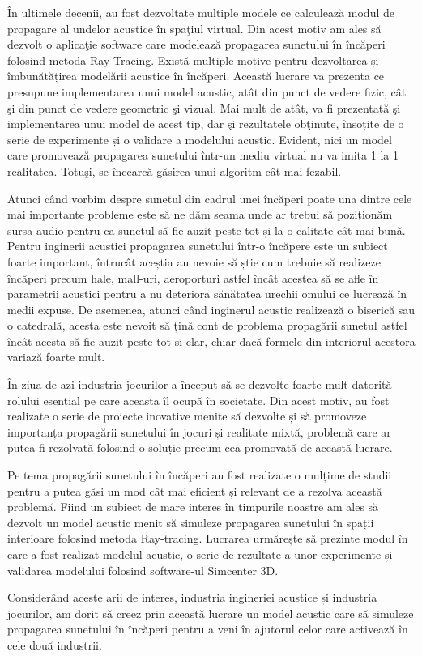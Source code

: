 	\^{I}n ultimele decenii, au fost dezvoltate multiple modele ce calculeaz\u{a} modul de propagare al undelor acustice \^{i}n spa\c{t}iul virtual. Din acest motiv am ales s\u{a} dezvolt o aplica\c{t}ie software care modeleaz\u{a} propagarea sunetului în încăperi folosind metoda Ray-Tracing. Exist\u{a} multiple motive pentru dezvoltarea și îmbunătățirea model\u{a}rii acustice \^{i}n \^{i}nc\u{a}peri. Aceast\u{a} lucrare va prezenta ce presupune implementarea unui model acustic, at\^{a}t din punct de vedere fizic, c\^{a}t \c{s}i din punct de vedere geometric \c{s}i vizual. Mai mult de at\^{a}t, va fi prezentat\u{a} \c{s}i implementarea unui model de acest tip, dar \c{s}i rezultatele ob\c{t}inute, însoțite de o serie de experimente și o validare a modelului acustic. Evident, nici un model care promovează propagarea sunetului \^{i}ntr-un mediu virtual nu va imita 1 la 1 realitatea. Totu\c{s}i, se \^{i}ncearc\u{a} g\u{a}sirea unui algoritm c\^{a}t mai fezabil.

	Atunci când vorbim despre sunetul din cadrul unei încăperi poate una dintre cele mai importante probleme este să ne dăm seama unde ar trebui să poziționăm sursa audio pentru ca sunetul să fie auzit peste tot și la o calitate cât mai bună. Pentru inginerii acustici propagarea sunetului într-o încăpere este un subiect foarte important, întrucât aceștia au nevoie să știe cum trebuie să realizeze încăperi precum hale, mall-uri, aeroporturi astfel încât acestea să se afle în parametrii acustici pentru a nu deteriora sănătatea urechii omului ce lucrează în medii expuse. De asemenea, atunci când inginerul acustic realizează o biserică sau o catedrală, acesta este nevoit să țină cont de problema propagării sunetul astfel încât acesta să fie auzit peste tot și clar, chiar dacă formele din interiorul acestora variază foarte mult.
	
	În ziua de azi industria jocurilor a început să se dezvolte foarte mult datorită rolului esențial pe care aceasta îl ocupă în societate. Din acest motiv, au fost realizate o serie de proiecte inovative menite să dezvolte și să promoveze importanța propagării sunetului în jocuri și realitate mixtă, problemă care ar putea fi rezolvată folosind o soluție precum cea promovată de această lucrare.
	
	Pe tema propagării sunetului în încăperi au fost realizate o mulțime de studii pentru a putea găsi un mod cât mai eficient și relevant de a rezolva această problemă. Fiind un subiect de mare interes în timpurile noastre am ales să dezvolt un model acustic menit să simuleze propagarea sunetului în spații interioare folosind metoda Ray-tracing. Lucrarea urmărește să prezinte modul în care a fost realizat modelul acustic, o serie de rezultate a unor experimente și validarea modelului folosind software-ul Simcenter 3D.
	
	Considerând aceste arii de interes, industria ingineriei acustice și industria jocurilor, am dorit să creez prin această lucrare un model acustic care să simuleze propagarea sunetului în încăperi pentru a veni în ajutorul celor care activează în cele două industrii.